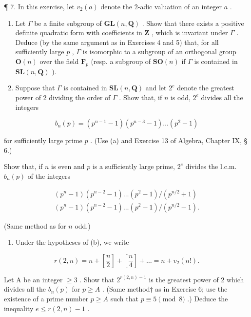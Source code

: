 ¶ 7. In this exercise, let \(v_{2}(a)\) denote the 2-adic valuation of an integer \(a\) .

\begin{enumerate}
\def\labelenumi{(\alph{enumi})}
\item
  Let \(\Gamma\) be a finite subgroup of \(\mathbf{GL}(n,\mathbf{Q})\) . Show that there exists a positive definite quadratic form with coefficients in \(\mathbf{Z}\) , which is invariant under \(\Gamma\) . Deduce (by the same argument as in Exercises 4 and 5) that, for all sufficiently large \(p\) , \(\Gamma\) is isomorphic to a subgroup of an orthogonal group \(\mathbf{O}(n)\) over the field \(\mathbf{F}_p\) (resp. a subgroup of \(\mathbf{SO}(n)\) if \(\Gamma\) is contained in \(\mathbf{SL}(n,\mathbf{Q})\) ).
\item
  Suppose that \(\Gamma\) is contained in \(\mathbf{SL}(n, \mathbf{Q})\) and let \(2^e\) denote the greatest power of 2 dividing the order of \(\Gamma\) . Show that, if \(n\) is odd, \(2^e\) divides all the integers
\end{enumerate}

\[
b _ {n} (p) = \left(p ^ {n - 1} - 1\right) \left(p ^ {n - 3} - 1\right) \dots \left(p ^ {2} - 1\right)
\]

for sufficiently large prime \(p\) . (Use (a) and Exercise 13 of Algebra, Chapter IX, § 6.)

Show that, if \(n\) is even and \(p\) is a sufficiently large prime, \(2^e\) divides the l.c.m. \(b_n(p)\) of the integers

\[
\begin{array}{l} (p ^ {n} - 1) (p ^ {n - 2} - 1) \dots (p ^ {2} - 1) / (p ^ {n / 2} + 1) \\ (p ^ {n} - 1) (p ^ {n - 2} - 1) \dots (p ^ {2} - 1) / (p ^ {n / 2} - 1). \end{array}
\]

(Same method as for \(n\) odd.)

\begin{enumerate}
\def\labelenumi{(\alph{enumi})}
\setcounter{enumi}{2}
\tightlist
\item
  Under the hypotheses of (b), we write
\end{enumerate}

\[
r (2, n) = n + \left[ \frac {n}{2} \right] + \left[ \frac {n}{4} \right] + \dots = n + v _ {2} (n!).
\]

Let A be an integer \(\geqslant 3\) . Show that \(2^{r(2,n)-1}\) is the greatest power of 2 which divides all the \(b_n(p)\) for \(p \geqslant A\) . (Same method† as in Exercise 6; use the existence of a prime number \(p \geqslant A\) such that \(p \equiv 5 \pmod{8}\) .) Deduce the inequality \(e \leqslant r(2,n) - 1\) .

